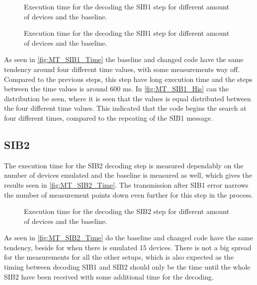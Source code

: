\begin{minipage}{0.48\textwidth}
\begin{figure}[H]
\centering
\resizebox{0.9\textwidth}{!}{
}
\caption{Execution time for the decoding the SIB1 step for different amount of devices and the baseline.}
\label{fig:MT_SIB1_Time}
\end{figure}
\end{minipage}%
\hfill
\begin{minipage}{0.48\textwidth}
\begin{figure}[H]
\centering
\resizebox{0.9\textwidth}{!}{
}
\caption{Execution time for the decoding the SIB1 step for different amount of devices and the baseline.}
\label{fig:MT_SIB1_His}
\end{figure}
\end{minipage}

As seen in \autoref{fig:MT_SIB1_Time} the baseline and changed code have the same tendency around four different time values, with some measurements way off. Compared to the previous steps, this step have long execution time and the steps between the time values is around 600 ms. In \autoref{fig:MT_SIB1_His} can the distribution be seen, where it is seen that the values is equal distributed between the four different time values. This indicated that the code begins the search at four different times, compared to the repeating of the SIB1 message.


\subsection{SIB2}
The execution time for the SIB2 decoding step is measured dependably on the number of devices emulated and the baseline is measured as well, which gives the results seen in \autoref{fig:MT_SIB2_Time}. The transmission after SIB1 error narrows the number of measurement points down even further for this step in the process.

\begin{figure}[H]
\centering
\resizebox{0.5\textwidth}{!}{
}
\caption{Execution time for the decoding the SIB2 step for different amount of devices and the baseline.}
\label{fig:MT_SIB2_Time}
\end{figure}


As seen in \autoref{fig:MT_SIB2_Time} do the baseline and changed code have the same tendency, beside for when there is emulated 15 devices. There is not a big spread for the measurements for all the other setups, which is also expected as the timing between decoding SIB1 and SIB2 should only be the time until the whole SIB2 have been received with some additional time for the decoding.

